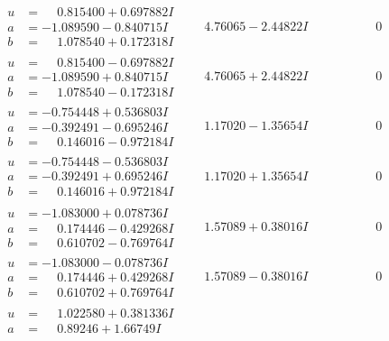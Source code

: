 \documentclass[1p]{elsarticle_modified}
\theoremstyle{definition}
\begin{document}
$$\begin{array}{c|c|c}
 \hline 
\begin{aligned}
u &= \phantom{-}0.815400 + 0.697882 I \\
a &= -1.089590 - 0.840715 I \\
b &= \phantom{-}1.078540 + 0.172318 I\end{aligned}
 & \phantom{-}4.76065 - 2.44822 I & \phantom{-0.000000 } 0 \\ \hline\begin{aligned}
u &= \phantom{-}0.815400 - 0.697882 I \\
a &= -1.089590 + 0.840715 I \\
b &= \phantom{-}1.078540 - 0.172318 I\end{aligned}
 & \phantom{-}4.76065 + 2.44822 I & \phantom{-0.000000 } 0 \\ \hline\begin{aligned}
u &= -0.754448 + 0.536803 I \\
a &= -0.392491 - 0.695246 I \\
b &= \phantom{-}0.146016 - 0.972184 I\end{aligned}
 & \phantom{-}1.17020 - 1.35654 I & \phantom{-0.000000 } 0 \\ \hline\begin{aligned}
u &= -0.754448 - 0.536803 I \\
a &= -0.392491 + 0.695246 I \\
b &= \phantom{-}0.146016 + 0.972184 I\end{aligned}
 & \phantom{-}1.17020 + 1.35654 I & \phantom{-0.000000 } 0 \\ \hline\begin{aligned}
u &= -1.083000 + 0.078736 I \\
a &= \phantom{-}0.174446 - 0.429268 I \\
b &= \phantom{-}0.610702 - 0.769764 I\end{aligned}
 & \phantom{-}1.57089 + 0.38016 I & \phantom{-0.000000 } 0 \\ \hline\begin{aligned}
u &= -1.083000 - 0.078736 I \\
a &= \phantom{-}0.174446 + 0.429268 I \\
b &= \phantom{-}0.610702 + 0.769764 I\end{aligned}
 & \phantom{-}1.57089 - 0.38016 I & \phantom{-0.000000 } 0 \\ \hline\begin{aligned}
u &= \phantom{-}1.022580 + 0.381336 I \\
a &= \phantom{-}0.89246 + 1.66749 I \\

\end{aligned}
\end{array}$$
\end{document}
